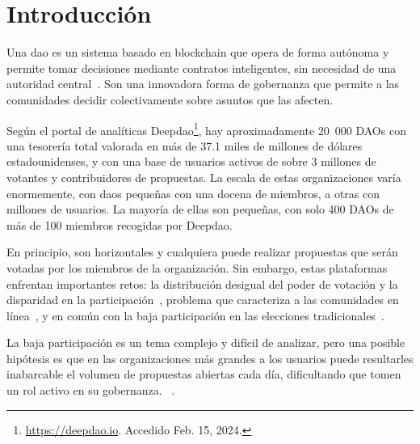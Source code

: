 \chapter{Introducción}

Una \ac{dao} es un sistema basado en blockchain que opera de forma autónoma y permite tomar decisiones mediante contratos inteligentes, sin necesidad de una autoridad central~\cite{hassan_decentralized_2021}. Son una innovadora forma de gobernanza que permite a las comunidades decidir colectivamente sobre asuntos que las afecten.

Según el portal de analíticas Deepdao\footnote{\url{https://deepdao.io}. Accedido Feb. 15, 2024.}, hay aproximadamente 20~000 DAOs con una tesorería total valorada en más de 37.1 miles de millones de dólares estadounidenses, y con una base de usuarios activos de sobre 3 millones de votantes y contribuidores de propuestas. La escala de estas organizaciones varía enormemente, con \glspl{dao} pequeñas con una docena de miembros, a otras con millones de usuarios. La mayoría de ellas son pequeñas, con solo 400 DAOs de más de 100 miembros recogidas por Deepdao.

En principio, son horizontales y cualquiera puede realizar propuestas que serán votadas por los miembros de la organización. Sin embargo, estas plataformas enfrentan importantes retos: la distribución desigual del poder de votación y la disparidad en la participación~\cite{arroyo_dao-analyzer_2022}, problema que caracteriza a las comunidades en línea~\cite{nielsen_participation_2006}, y en común con la baja participación en las elecciones tradicionales~\cite{geys_explaining_2006}.

La baja participación es un tema complejo y difícil de analizar, pero una posible hipótesis es que en las organizaciones más grandes a los usuarios puede resultarles inabarcable el volumen de propuestas abiertas cada día, dificultando que tomen un rol activo en su gobernanza. ~\cite{halaburda_will_2019}.

